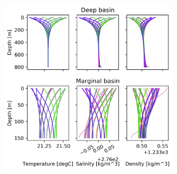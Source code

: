 \documentclass[twocolumn]{article}
\begin{document}

\begin{figure}
\begin{subfigure}[h]{0.7\textwidth}
\centering
\includegraphics[width=\textwidth,keepaspectratio]{high_bg_diff_kleine_uitslag.png}
\end{subfigure}\hfill
\begin{subfigure}[h]{0.20\textwidth}
\centering

\end{subfigure}
\end{figure}
\end{document}

